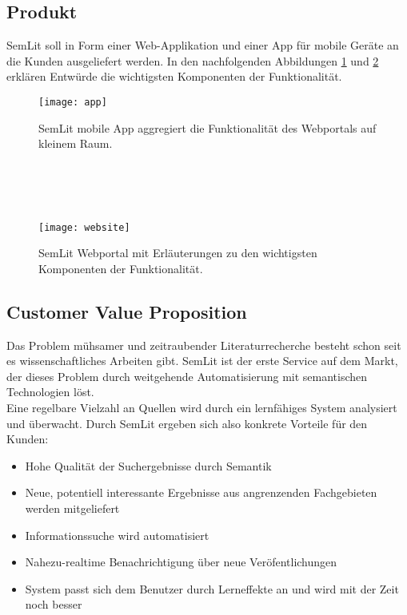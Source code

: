 
\subsection{Produkt}
SemLit soll in Form einer Web-Applikation und einer App für mobile Geräte an die Kunden ausgeliefert werden. In den nachfolgenden Abbildungen \ref{fig:app} und \ref{fig:website} erklären Entwürde die wichtigsten Komponenten der Funktionalität. 
\\
\begin{figure}[h!]
\centering
\texttt{[image: app]}
\caption{SemLit mobile App aggregiert die Funktionalität des Webportals auf kleinem Raum.}
\label{fig:app}
\end{figure}
\\
\\
\\
\begin{figure}[h!]
\centering
\texttt{[image: website]}
\caption{SemLit Webportal mit Erläuterungen zu den wichtigsten Komponenten der Funktionalität.}
\label{fig:website}
\end{figure}

\newpage

\subsection{Customer Value Proposition}
Das Problem mühsamer und zeitraubender Literaturrecherche besteht schon seit es wissenschaftliches Arbeiten gibt. SemLit ist der erste Service auf dem Markt, der dieses Problem durch weitgehende Automatisierung mit semantischen Technologien löst. 
\\
Eine regelbare Vielzahl an Quellen wird durch ein lernfähiges System analysiert und überwacht. Durch SemLit ergeben sich also konkrete Vorteile für den Kunden:
\begin{itemize}
\item Hohe Qualität der Suchergebnisse durch Semantik
\item Neue, potentiell interessante Ergebnisse aus angrenzenden Fachgebieten werden mitgeliefert
\item Informationssuche wird automatisiert
\item Nahezu-realtime Benachrichtigung über neue Veröfentlichungen
\item System passt sich dem Benutzer durch Lerneffekte an und wird mit der Zeit noch besser
\end{itemize}

